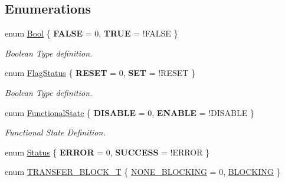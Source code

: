 \subsection*{Enumerations}
\begin{DoxyCompactItemize}
\item 
\hypertarget{group___l_p_c___types___public___types_ga39db6982619d623273fad8a383489309}{enum \hyperlink{group___l_p_c___types___public___types_ga39db6982619d623273fad8a383489309}{Bool} \{ {\bfseries F\+A\+L\+S\+E} = 0, 
{\bfseries T\+R\+U\+E} = !\+F\+A\+L\+S\+E
 \}}\label{group___l_p_c___types___public___types_ga39db6982619d623273fad8a383489309}

\begin{DoxyCompactList}\small\item\em Boolean Type definition. \end{DoxyCompactList}\item 
enum \hyperlink{group___l_p_c___types___public___types_ga89136caac2e14c55151f527ac02daaff}{Flag\+Status} \{ {\bfseries R\+E\+S\+E\+T} = 0, 
{\bfseries S\+E\+T} = !\+R\+E\+S\+E\+T
 \}
\begin{DoxyCompactList}\small\item\em Boolean Type definition. \end{DoxyCompactList}\item 
\hypertarget{group___l_p_c___types___public___types_gac9a7e9a35d2513ec15c3b537aaa4fba1}{enum \hyperlink{group___l_p_c___types___public___types_gac9a7e9a35d2513ec15c3b537aaa4fba1}{Functional\+State} \{ {\bfseries D\+I\+S\+A\+B\+L\+E} = 0, 
{\bfseries E\+N\+A\+B\+L\+E} = !\+D\+I\+S\+A\+B\+L\+E
 \}}\label{group___l_p_c___types___public___types_gac9a7e9a35d2513ec15c3b537aaa4fba1}

\begin{DoxyCompactList}\small\item\em Functional State Definition. \end{DoxyCompactList}\item 
enum \hyperlink{group___l_p_c___types___public___types_ga67a0db04d321a74b7e7fcfd3f1a3f70b}{Status} \{ {\bfseries E\+R\+R\+O\+R} = 0, 
{\bfseries S\+U\+C\+C\+E\+S\+S} = !\+E\+R\+R\+O\+R
 \}
\item 
enum \hyperlink{group___l_p_c___types___public___types_gaf5297347bed33665c55dd0e9c7840403}{T\+R\+A\+N\+S\+F\+E\+R\+\_\+\+B\+L\+O\+C\+K\+\_\+\+T} \{ \hyperlink{group___l_p_c___types___public___types_ggaf5297347bed33665c55dd0e9c7840403ae00130e64382c35d172d226b79aa9acb}{N\+O\+N\+E\+\_\+\+B\+L\+O\+C\+K\+I\+N\+G} = 0, 
\hyperlink{group___l_p_c___types___public___types_ggaf5297347bed33665c55dd0e9c7840403a854a1cd6e3a98db9e290dddea29725e7}{B\+L\+O\+C\+K\+I\+N\+G}
 \}
\end{DoxyCompactItemize}


